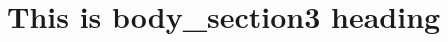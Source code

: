 \section{This is body\_section3 heading}


\blindtext[2]




\blindtext[2]


\blindtext[3]


\blindtext[2]

